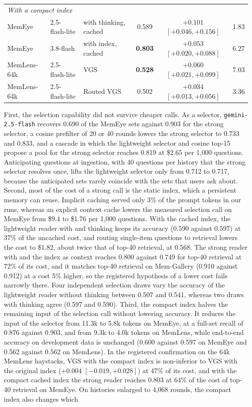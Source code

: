 \begin{table}[t]
{\begin{tabular}{lllccr}
\midrule
\multicolumn{6}{l}{\emph{With a compact index}} \\
MemEye & 2.5-flash-lite & \qss{} with thinking, cached & 0.589 & $+0.101$ $[+0.046, +0.156]$ & 1.83 \\
MemEye & 3.8-flash & \qss{} with index, cached & \textbf{0.803} & $+0.053$ $[+0.020, +0.088]$ & 6.27 \\
MemLens-64k & 2.5-flash-lite & VGS & \textbf{0.528} & $+0.060$ $[+0.021, +0.099]$ & 7.03 \\
MemLens-64k & 2.5-flash-lite & Routed VGS & 0.502 & $+0.034$ $[+0.013, +0.056]$ & 3.36 \\
\bottomrule
\end{tabular}}
\end{table}

First, the selection capability did not survive cheaper calls. As a selector, \texttt{gemini-2.5-flash} recovers 0.690 of the MemEye sets against 0.903 for the strong selector, a cosine prefilter of 20 or 40 rounds lowers the strong selector to 0.733 and 0.833, and a cascade in which the lightweight selector and cosine top-15 propose a pool for the strong selector reaches 0.819 at \$2.65 per 1,000 questions. Anticipating questions at ingestion, with 40 questions per history that the strong selector resolves once, lifts the lightweight selector only from 0.712 to 0.717, because the anticipated sets rarely coincide with the sets that users ask about. Second, most of the cost of a strong call is the static index, which a persistent memory can reuse. Implicit caching served only 3\% of the prompt tokens in our runs, whereas an explicit context cache lowers the measured selection call on MemEye from \$9.4 to \$1.76 per 1,000 questions. With the cached index, the lightweight reader with \qss{} and thinking keeps its accuracy (0.590 against 0.597) at 37\% of the uncached cost, and routing single-item questions to retrieval lowers the cost to \$1.82, about twice that of top-40 retrieval, at 0.568. The strong reader with \qss{} and the index as context reaches 0.800 against 0.749 for top-40 retrieval at 72\% of its cost, and it matches top-40 retrieval on Mem-Gallery (0.910 against 0.912) at a cost 5\% higher, so the registered hypothesis of a lower cost fails narrowly there. Four independent selection draws vary the accuracy of the lightweight reader without thinking between 0.507 and 0.541, whereas two draws with thinking agree (0.597 and 0.590). Third, the compact index halves the remaining input of the selection call without lowering accuracy. It reduces the input of the selector from 11.3k to 5.8k tokens on MemEye, at a full-set recall of 0.876 against 0.903, and from 9.3k to 4.0k tokens on MemLens, while end-to-end accuracy on development data is unchanged (0.600 against 0.597 on MemEye and 0.562 against 0.562 on MemLens). In the registered confirmation on the 64k MemLens haystacks, VGS with the compact index is non-inferior to VGS with the original index ($+0.004$ $[-0.019, +0.028]$) at 47\% of its cost, and with the compact cached index the strong reader reaches 0.803 at 64\% of the cost of top-40 retrieval on MemEye. On histories enlarged to 4,068 rounds, the compact index also changes which 